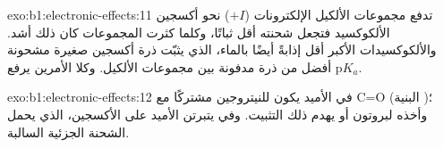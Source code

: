 \begin{solution}{exo:b1:electronic-effects:11}
تدفع مجموعات الألكيل الإلكترونات ($+I$) نحو أكسجين الألكوكسيد فتجعل
شحنته أقل ثباتًا، وكلما كثرت المجموعات كان ذلك أشد. والألكوكسيدات الأكبر
أقل إذابةً أيضًا بالماء، الذي يثبّت ذرة أكسجين صغيرة مشحونة
أفضل من ذرة مدفونة بين مجموعات الألكيل. وكلا الأمرين يرفع
$\mathrm{p}K_a$.
\end{solution}

\begin{solution}{exo:b1:electronic-effects:12}
في الأميد يكون  للنيتروجين مشتركًا مع C=O
(البنية )؛ وأخذه لبروتون أو 
يهدم ذلك التثبيت. وفي  يتبرتن الأميد على
الأكسجين، الذي يحمل الشحنة الجزئية السالبة.
\end{solution}

